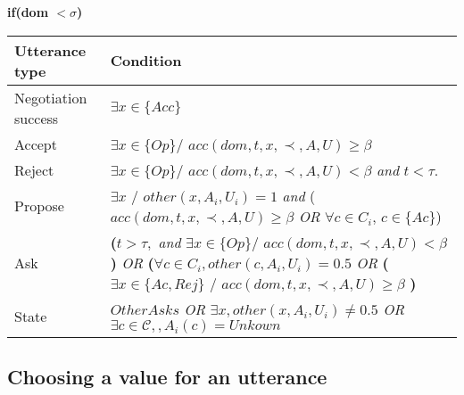 \documentclass{article}
\begin{document}
	\textbf{if(\textbf{dom  $<\sigma$})} \\
	\begin{tabular}{|p{3cm}|p{9cm}|}
		\hline
		\textbf{Utterance type} & Condition \\
		\hline
		Negotiation success &  $\exists x \in \{Acc\}$ \\
		\hline
		Accept & $\exists x \in \{Op\} /$ \newline $acc(dom,t,x,\prec,A,U) \geq \beta$ \\
		\hline
		Reject & $\exists x \in \{Op\} /$ \newline $ acc(dom,t,x,\prec,A,U) < \beta$  \emph{and} $t<\tau$.\\
		\hline
		Propose & $\exists x$ / $other(x, A_i, U_i)  = 1 $  \emph{and}
		\newline ($acc(dom,t,x,\prec,A,U) \geq \beta$
		\newline \emph{OR}  
		\newline $\forall c \in C_i$,  $c \in \{Ac\}$)\\
		\hline
		Ask &  \textbf{(}$t> \tau,$ \emph{and} 
		\newline $\exists x \in \{Op\} /$
		\newline $ acc(dom,t,x,\prec,A,U) < \beta $\textbf{) }
		\newline \emph{OR}
		\newline \textbf{(}$ \forall c \in C_i,other(c, A_i, U_i)=0.5$
		\newline \emph{OR} 
		\newline \textbf{(}$\exists x \in \{Ac, Rej\}$ / 
		\newline $acc(dom,t,x,\prec,A,U) \geq \beta$ \textbf{)} \\
		\hline
		
		State & $OtherAsks$
		\newline \emph{OR}
		\newline $\exists x,other(x, A_i, U_i) \not = 0.5 $ 
		\newline \emph{OR}
		\newline $ \exists c \in \mathcal{C}, , A_i(c) = Unkown$
		\\
		\hline
	\end{tabular}
	

	\subsection{Choosing a value for an utterance}
	
	
\end{document}
